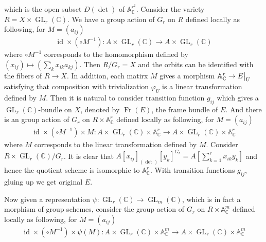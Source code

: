 \documentclass{ctexart}
\newcommand{\identity}{\operatorname{id}}
\newcommand{\framebundle}{\operatorname{Fr}}
\newcommand{\generallineargroup}[2]{\operatorname{GL}_{#1}(#2)}
\begin{document}
which is the open subset $D(\det)$ of $\mathbb{A}_{\mathbb{C}}^{r^{2}}$.
Consider the variety $R = X \times \generallineargroup{r}{\mathbb{C}}$.
We have a group action of $G_{r}$ on $R$ defined locally as following, for $M = (a_{ij})$
\begin{equation}
    \begin{split}
        \identity \times (\circ M^{-1}): A \times \generallineargroup{r}{\mathbb{C}} \rightarrow A \times \generallineargroup{r}{\mathbb{C}}
    \end{split}
\end{equation}
where $\circ M^{-1}$ corresponds to the homomorphism defined by $(x_{ij}) \mapsto (\sum_{k} x_{ik}a_{kj})$.
Then $R/G_{r} = X$ and the orbits can be identified with the fibers of $R \rightarrow X$.
In addition, each matirx $M$ gives a morphism $\mathbb{A}_{\mathbb{C}}^{r} \rightarrow E\big{|}_{U}$ satisfying that composition with trivialization $\varphi_{U}$ is a linear transformation defined by $M$.
Then it is natural to consider transition function $g_{ij}$ which gives a $\generallineargroup{r}{\mathbb{C}}$-bundle on $X$, denoted by $\framebundle (E)$, the frame bundle of $E$.
And there is an group action of $G_{r}$ on $R \times \mathbb{A}_{\mathbb{C}}^{r}$ defined locally as following, for $M = (a_{ij})$
\begin{equation}
    \begin{split}
        \identity \times (\circ M^{-1}) \times M: A \times \generallineargroup{r}{\mathbb{C}} \times \mathbb{A}_{\mathbb{C}}^{r} \rightarrow A \times \generallineargroup{r}{\mathbb{C}} \times \mathbb{A}_{\mathbb{C}}^{r}
    \end{split}
\end{equation}
where $M$ corresponds to the linear transformation defined by $M$.
Consider $R \times \generallineargroup{r}{\mathbb{C}}/G_{r}$.
It is clear that $A[x_{ij}]_{(\det)}[y_{k}]^{G_{r}} = A[\sum_{k = 1}^{r} x_{ik}y_{k}]$ and hence the quotient scheme is isomorphic to $\mathbb{A}_{\mathbb{C}}^{r}$.
With transition functions $g_{ij}$, gluing up we get original $E$.  
\par
Now given a representation $\psi: \generallineargroup{r}{\mathbb{C}} \rightarrow \generallineargroup{m}{\mathbb{C}}$,
which is in fact a morphism of group schemes,
consider the group action of $G_{r}$ on $R \times \mathbb{A}_{\mathbb{C}}^{m}$ defined locally as following, for $M = (a_{ij})$
\begin{equation}
    \begin{split}
        \identity \times (\circ M^{-1}) \times \psi(M): A \times \generallineargroup{r}{\mathbb{C}} \times \mathbb{A}_{\mathbb{C}}^{m} \rightarrow A \times \generallineargroup{r}{\mathbb{C}} \times \mathbb{A}_{\mathbb{C}}^{m}
    \end{split}
\end{equation}
\end{document}
